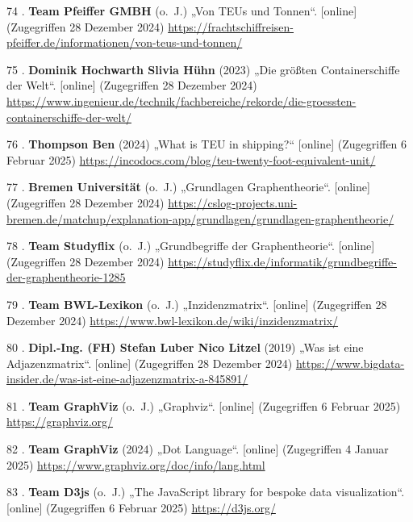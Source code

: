 \documentclass[
    headings=optiontotocandhead,%
    twoside,
    numbers=noenddot,%
    12pt, %
    titlepage, %
    parskip=full, %
    listof=leveldown, 
    numbers=noenddot, %
    a4paper,DIV=14,
    BCOR=15mm,
]{scrbook}
\newlength{\cslhangindent}
\newenvironment{cslreferences}%
  {\setlength{\parindent}{0pt}%
  \everypar{\setlength{\hangindent}{\cslhangindent}}\ignorespaces}%
  {\par}
\begin{document}
\begin{cslreferences}
\leavevmode\hypertarget{ref-Pfeiffer-Containerschiffe}{}%
74 . \textbf{Team Pfeiffer GMBH} (o.~J.) „Von TEUs und Tonnen``.
{[}online{]} (Zugegriffen 28 Dezember 2024)
\url{https://frachtschiffreisen-pfeiffer.de/informationen/von-teus-und-tonnen/}

\leavevmode\hypertarget{ref-IngenieurDE-Containershiffe}{}%
75 . \textbf{Dominik Hochwarth Slivia Hühn} (2023) „Die größten
Containerschiffe der Welt``. {[}online{]} (Zugegriffen 28 Dezember 2024)
\url{https://www.ingenieur.de/technik/fachbereiche/rekorde/die-groessten-containerschiffe-der-welt/}

\leavevmode\hypertarget{ref-IncoDocs-TEU}{}%
76 . \textbf{Thompson Ben} (2024) „What is TEU in shipping?{}``
{[}online{]} (Zugegriffen 6 Februar 2025)
\url{https://incodocs.com/blog/teu-twenty-foot-equivalent-unit/}

\leavevmode\hypertarget{ref-Uni-Bremen-Graphentheorie}{}%
77 . \textbf{Bremen Universität} (o.~J.) „Grundlagen Graphentheorie``.
{[}online{]} (Zugegriffen 28 Dezember 2024)
\url{https://cslog-projects.uni-bremen.de/matchup/explanation-app/grundlagen/grundlagen-graphentheorie/}

\leavevmode\hypertarget{ref-Studyflix-Graphentheorie}{}%
78 . \textbf{Team Studyflix} (o.~J.) „Grundbegriffe der
Graphentheorie``. {[}online{]} (Zugegriffen 28 Dezember 2024)
\url{https://studyflix.de/informatik/grundbegriffe-der-graphentheorie-1285}

\leavevmode\hypertarget{ref-BWL-Lexikon-Inzidenzmatrix}{}%
79 . \textbf{Team BWL-Lexikon} (o.~J.) „Inzidenzmatrix``. {[}online{]}
(Zugegriffen 28 Dezember 2024)
\url{https://www.bwl-lexikon.de/wiki/inzidenzmatrix/}

\leavevmode\hypertarget{ref-BigDataInsider}{}%
80 . \textbf{Dipl.-Ing. (FH) Stefan Luber Nico Litzel} (2019) „Was ist
eine Adjazenzmatrix``. {[}online{]} (Zugegriffen 28 Dezember 2024)
\url{https://www.bigdata-insider.de/was-ist-eine-adjazenzmatrix-a-845891/}

\leavevmode\hypertarget{ref-Graphviz-Homepage}{}%
81 . \textbf{Team GraphViz} (o.~J.) „Graphviz``. {[}online{]}
(Zugegriffen 6 Februar 2025) \url{https://graphviz.org/}

\leavevmode\hypertarget{ref-GraphViz-Documentation}{}%
82 . \textbf{Team GraphViz} (2024) „Dot Language``. {[}online{]}
(Zugegriffen 4 Januar 2025)
\url{https://www.graphviz.org/doc/info/lang.html}

\leavevmode\hypertarget{ref-D3js-Homepage}{}%
83 . \textbf{Team D3js} (o.~J.) „The JavaScript library for bespoke data
visualization``. {[}online{]} (Zugegriffen 6 Februar 2025)
\url{https://d3js.org/}


\end{cslreferences}
\end{document}
